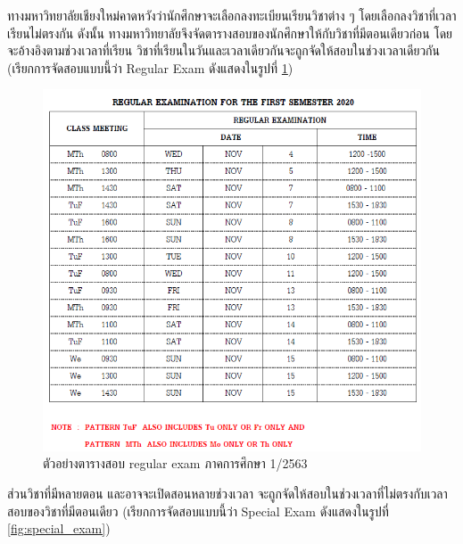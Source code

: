 ทางมหาวิทยาลัยเชียงใหม่คาดหวังว่านักศึกษาจะเลือกลงทะเบียนเรียนวิชาต่าง ๆ โดยเลือกลงวิชาที่เวลาเรียนไม่ตรงกัน 
ดังนั้น ทางมหาวิทยาลัยจึงจัดตารางสอบของนักศึกษาให้กับวิชาที่มีตอนเดียวก่อน โดยจะอ้างอิงตามช่วงเวลาที่เรียน 
วิชาที่เรียนในวันและเวลาเดียวกันจะถูกจัดให้สอบในช่วงเวลาเดียวกัน (เรียกการจัดสอบแบบนี้ว่า Regular Exam ดังแสดงในรูปที่ \ref{fig:regular_exam}) 
%
\begin{figure}
    \centering
    \includegraphics[width=\linewidth]{images/regular_exam.png}
    \caption[ตัวอย่างตารางสอบ regular exam ภาคการศึกษา 1/2563]{ตัวอย่างตารางสอบ regular exam ภาคการศึกษา 1/2563}
    \label{fig:regular_exam}
\end{figure}
%
ส่วนวิชาที่มีหลายตอน และอาจจะเปิดสอนหลายช่วงเวลา จะถูกจัดให้สอบในช่วงเวลาที่ไม่ตรงกับเวลาสอบของวิชาที่มีตอนเดียว  (เรียกการจัดสอบแบบนี้ว่า Special Exam ดังแสดงในรูปที่ \ref{fig:special_exam}) 
%
